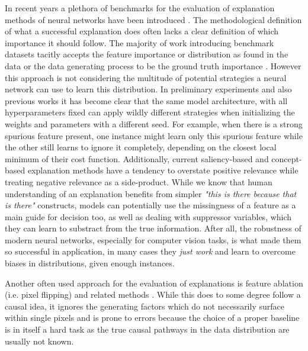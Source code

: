 In recent years a plethora of benchmarks for the evaluation of explanation methods of neural networks have been introduced .
The methodological definition of what a successful explanation does often lacks a clear definition of which importance it should follow. The majority of work introducing benchmark datasets tacitly accepts the feature importance or distribution as found in the data or the data generating process to be the ground truth importance . However this approach is not considering the multitude of potential strategies a neural network can use to learn this distribution.
In preliminary experiments and also previous works it has become clear that the same model architecture, with all hyperparameters fixed can apply wildly different strategies when initializing the weights and parameters with a different seed. For example, when there is a strong spurious feature present, one instance might learn only this spurious feature while the other still learns to ignore it completely, depending on the closest local minimum of their cost function.
Additionally, current saliency-based and concept-based explanation methods have a tendency to overstate positive relevance while treating negative relevance as a side-product. While we know that human understanding of an explanation benefits from simpler \textit{"this is there because that is there"} constructs, models can potentially use the missingness of a feature as a main guide for decision too, as well as dealing with suppressor variables, which they can learn to substract from the true information. After all, the robustness of modern neural networks, especially for computer vision tasks, is what made them so successful in application, in many cases they \textit{just work} and learn to overcome biases in distributions, given enough instances. 


Another often used approach for the evaluation of explanations is feature ablation (i.e. pixel flipping) and related methods . While this does to some degree follow a causal idea, it ignores the generating factors which do not necessarily surface within single pixels and is prone to errors because the choice of a proper baseline is in itself a hard task as the true causal pathways in the data distribution are usually not known. 


